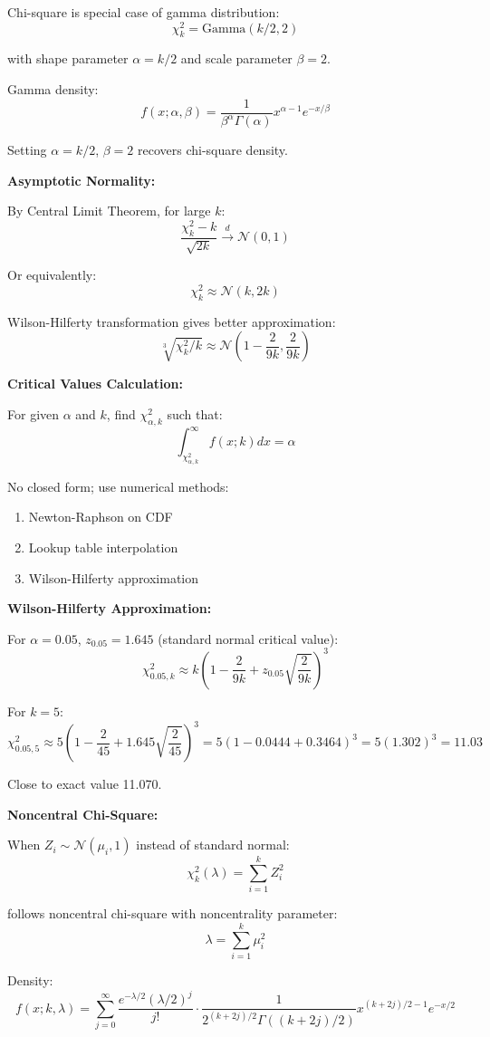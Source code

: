 \documentclass[12pt]{article}
\begin{document}
\begin{explanation}
Chi-square is special case of gamma distribution:
\[
\chi^2_k = \text{Gamma}(k/2, 2)
\]

with shape parameter $\alpha = k/2$ and scale parameter $\beta = 2$.

Gamma density:
\[
f(x; \alpha, \beta) = \frac{1}{\beta^\alpha\Gamma(\alpha)}x^{\alpha-1}e^{-x/\beta}
\]

Setting $\alpha = k/2$, $\beta = 2$ recovers chi-square density.

\textbf{Asymptotic Normality:}

By Central Limit Theorem, for large $k$:
\[
\frac{\chi^2_k - k}{\sqrt{2k}} \xrightarrow{d} \mathcal{N}(0, 1)
\]

Or equivalently:
\[
\chi^2_k \approx \mathcal{N}(k, 2k)
\]

Wilson-Hilferty transformation gives better approximation:
\[
\sqrt[3]{\chi^2_k/k} \approx \mathcal{N}\left(1 - \frac{2}{9k}, \frac{2}{9k}\right)
\]

\textbf{Critical Values Calculation:}

For given $\alpha$ and $k$, find $\chi^2_{\alpha, k}$ such that:
\[
\int_{\chi^2_{\alpha,k}}^\infty f(x; k)dx = \alpha
\]

No closed form; use numerical methods:
\begin{enumerate}
    \item Newton-Raphson on CDF
    \item Lookup table interpolation
    \item Wilson-Hilferty approximation
\end{enumerate}

\textbf{Wilson-Hilferty Approximation:}

For $\alpha = 0.05$, $z_{0.05} = 1.645$ (standard normal critical value):
\[
\chi^2_{0.05, k} \approx k\left(1 - \frac{2}{9k} + z_{0.05}\sqrt{\frac{2}{9k}}\right)^3
\]

For $k = 5$:
\[
\chi^2_{0.05, 5} \approx 5\left(1 - \frac{2}{45} + 1.645\sqrt{\frac{2}{45}}\right)^3 = 5(1 - 0.0444 + 0.3464)^3 = 5(1.302)^3 = 11.03
\]

Close to exact value 11.070.

\textbf{Noncentral Chi-Square:}

When $Z_i \sim \mathcal{N}(\mu_i, 1)$ instead of standard normal:
\[
\chi^2_k(\lambda) = \sum_{i=1}^k Z_i^2
\]

follows noncentral chi-square with noncentrality parameter:
\[
\lambda = \sum_{i=1}^k \mu_i^2
\]

Density:
\[
f(x; k, \lambda) = \sum_{j=0}^\infty \frac{e^{-\lambda/2}(\lambda/2)^j}{j!} \cdot \frac{1}{2^{(k+2j)/2}\Gamma((k+2j)/2)}x^{(k+2j)/2-1}e^{-x/2}
\]


\end{explanation}
\end{document}
